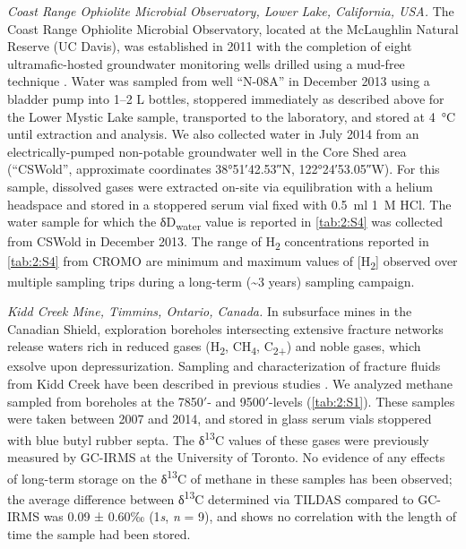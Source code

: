 \emph{Coast Range Ophiolite Microbial Observatory, Lower Lake,
	California, USA.} The Coast Range Ophiolite Microbial Observatory,
located at the McLaughlin Natural Reserve (UC Davis), was established in
2011 with the completion of eight ultramafic-hosted groundwater
monitoring wells drilled using a mud-free technique \parencite{Cardace++_2013_SD,Crespo-Medina++_2014_FMicro}. Water was sampled from well ``N-08A'' in December 2013 using
a bladder pump into 1--2 L bottles, stoppered immediately as described
above for the Lower Mystic Lake sample, transported to the laboratory,
and stored at 4~°C until extraction and analysis. We also collected
water in July 2014 from an electrically-pumped non-potable groundwater
well in the Core Shed area (``CSWold'', approximate coordinates
\ang[minimum-integer-digits=2]{38;51;42.53}N, \ang[minimum-integer-digits=2]{122;24;53.05}W). For this sample, dissolved gases were
extracted on-site via equilibration with a helium headspace and stored
in a stoppered serum vial fixed with 0.5~ml 1~M HCl. The water sample
for which the δD\textsubscript{water} value is reported in \autoref{tab:2:S4} was
collected from CSWold in December 2013. The range of H\textsubscript{2}
concentrations reported in \autoref{tab:2:S4} from CROMO are minimum and maximum
values of {[}H\textsubscript{2}{]} observed over multiple sampling trips
during a long-term (\textasciitilde{}3 years) sampling campaign.

\emph{Kidd Creek Mine, Timmins, Ontario, Canada.} In subsurface mines in
the Canadian Shield, exploration boreholes intersecting extensive
fracture networks release waters rich in reduced gases
(H\textsubscript{2}, CH\textsubscript{4}, C\textsubscript{2+}) and noble
gases, which exsolve upon depressurization. Sampling and
characterization of fracture fluids from Kidd Creek have been described
in previous studies \parencite{SherwoodLollar++_2008_GCA,SherwoodLollar++_2002_N,Holland++_2013_N,SherwoodLollar++_2007_Ab,Sherwood++_1988_CG}. We analyzed methane sampled from boreholes at the 7850$'$- and
9500$'$-levels (\autoref{tab:2:S1}). These samples were taken between 2007 and 2014,
and stored in glass serum vials stoppered with blue butyl rubber septa.
The δ\textsuperscript{13}C values of these gases were previously
measured by GC-IRMS at the University of Toronto. No evidence of any
effects of long-term storage on the δ\textsuperscript{13}C of methane in
these samples has been observed; the average difference between
δ\textsuperscript{13}C determined via TILDAS compared to GC-IRMS was
0.09 ± 0.60‰ (1\emph{s}, \emph{n} = 9), and shows no correlation with
the length of time the sample had been stored.

